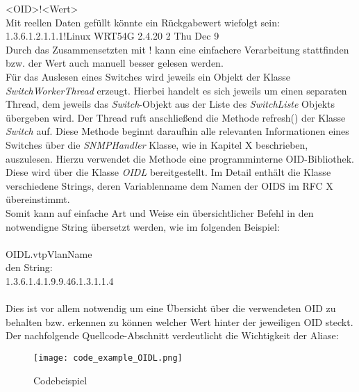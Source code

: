 <OID>!<Wert>\\

Mit reellen Daten gefüllt könnte ein Rückgabewert wiefolgt sein:\\

1.3.6.1.2.1.1.1!Linux WRT54G 2.4.20 2 Thu Dec 9\\


Durch das Zusammensetzten mit ! kann eine einfachere Verarbeitung stattfinden bzw. der Wert auch manuell besser gelesen werden.\\

Für das Auslesen eines Switches wird jeweils ein Objekt der Klasse \textit{SwitchWorkerThread} erzeugt. Hierbei handelt es sich jeweils um einen separaten Thread, dem jeweils das \textit{Switch}-Objekt aus der Liste des \textit{SwitchListe} Objekts übergeben wird.
Der Thread ruft anschließend die Methode refresh() der Klasse \textit{Switch} auf.
Diese Methode beginnt daraufhin alle relevanten Informationen eines Switches über die \textit{SNMPHandler} Klasse, wie in Kapitel X beschrieben, auszulesen.
Hierzu verwendet die Methode eine programminterne OID-Bibliothek. Diese wird über die Klasse \textit{OIDL} bereitgestellt. Im Detail enthält die Klasse verschiedene Strings, deren Variablenname dem Namen der OIDS im RFC X übereinstimmt.\\
Somit kann auf einfache Art und Weise ein übersichtlicher Befehl in den notwendigne String übersetzt werden, wie im folgenden Beispiel:\\
\\
OIDL.vtpVlanName\\
den String:\\
1.3.6.1.4.1.9.9.46.1.3.1.1.4\\
\\
Dies ist vor allem notwendig um eine Übersicht über die verwendeten OID zu behalten bzw. erkennen zu können welcher Wert hinter der jeweiligen OID steckt. Der nachfolgende Quellcode-Abschnitt verdeutlicht die Wichtigkeit der Aliase:\\

\begin{figure}[H]
\centering
\texttt{[image: code\_example\_OIDL.png]}
\caption{Codebeispiel}
\label{fig:classdiagramcode}
\end{figure}

